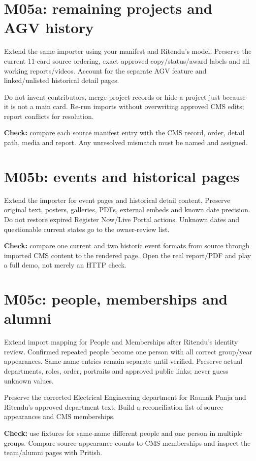 \documentclass[11pt]{article}
\begin{document}
\section{M05a: remaining projects and AGV history}
Extend the same importer using your manifest and Ritendu's model. Preserve the current 11-card source ordering, exact approved copy/status/award labels and all working reports/videos. Account for the separate AGV feature and linked/unlisted historical detail pages.

Do not invent contributors, merge project records or hide a project just because it is not a main card. Re-run imports without overwriting approved CMS edits; report conflicts for resolution.

\textbf{Check:} compare each source manifest entry with the CMS record, order, detail path, media and report. Any unresolved mismatch must be named and assigned.

\section{M05b: events and historical pages}
Extend the importer for event pages and historical detail content. Preserve original text, posters, galleries, PDFs, external embeds and known date precision. Do not restore expired Register Now/Live Portal actions. Unknown dates and questionable current states go to the owner-review list.

\textbf{Check:} compare one current and two historic event formats from source through imported CMS content to the rendered page. Open the real report/PDF and play a full demo, not merely an HTTP check.

\section{M05c: people, memberships and alumni}
Extend import mapping for People and Memberships after Ritendu's identity review. Confirmed repeated people become one person with all correct group/year appearances. Same-name entries remain separate until verified. Preserve actual departments, roles, order, portraits and approved public links; never guess unknown values.

Preserve the corrected Electrical Engineering department for Raunak Panja and Ritendu's approved department text. Build a reconciliation list of source appearances and CMS memberships.

\textbf{Check:} use fixtures for same-name different people and one person in multiple groups. Compare source appearance counts to CMS memberships and inspect the team/alumni pages with Pritish.
\end{document}
